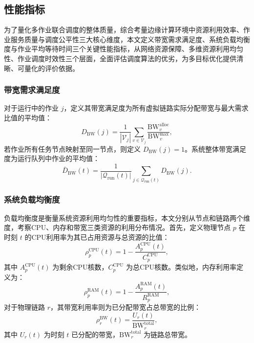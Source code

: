 \subsection{性能指标}
为了量化多作业联合调度的整体质量，综合考量边缘计算环境中资源利用效率、作业服务质量与调度公平性三大核心维度，本文定义带宽需求满足度、系统负载均衡度与作业平均等待时间三个关键性能指标，从网络资源保障、多维资源利用均匀性、作业调度时效性三个层面，全面评估调度算法的优劣，为多目标优化提供清晰、可量化的评价依据。

\subsubsection{带宽需求满足度}

对于运行中的作业 $j$，定义其带宽满足度为所有虚拟链路实际分配带宽与最大需求比值的平均值：
\begin{equation}
    D_{\text{BW}}(j) = \frac{1}{|\mathcal{V}_j|} \sum_{v \in \mathcal{V}_j} \frac{\text{BW}_v^{\text{alloc}}}{\text{BW}_v^{\max}},
\end{equation}
若作业所有任务节点映射至同一节点，则定义 $D_{\text{BW}}(j) = 1$。系统整体带宽满足度为运行队列中作业的平均值：
\begin{equation}
    \bar{D}_{\text{BW}}(t) = \frac{1}{|\mathcal{Q}_{\text{run}}(t)|} \sum_{j \in \mathcal{Q}_{\text{run}}(t)} D_{\text{BW}}(j).
\end{equation}

\subsubsection{系统负载均衡度}
负载均衡度是衡量系统资源利用均匀性的重要指标，本文分别从节点和链路两个维度，考察CPU、内存和带宽三类资源的利用分布情况。首先，定义物理节点 $p$ 在时刻 $t$ 的CPU利用率为其已占用资源与总资源的比值：
\begin{equation}
\rho_p^{\text{CPU}}(t) = 1 - \frac{A_p^{\text{CPU}}(t)}{C_p^{\text{CPU}}},
\end{equation}
其中 $A_p^{\text{CPU}}(t)$ 为剩余CPU核数，$C_p^{\text{CPU}}$ 为总CPU核数。类似地，内存利用率定义为：
\begin{equation}
\rho_p^{\text{RAM}}(t) = 1 - \frac{A_p^{\text{RAM}}(t)}{R_p^{\text{RAM}}},
\end{equation}
对于物理链路 $r$，其带宽利用率则为已分配带宽占总带宽的比例：
\begin{equation}
\rho_r^{\text{BW}}(t) = \frac{U_r(t)}{\text{BW}_r^{\text{total}}},
\end{equation}
其中 $U_r(t)$ 为时刻 $t$ 已分配的带宽，$\text{BW}_r^{\text{total}}$ 为链路总带宽。

